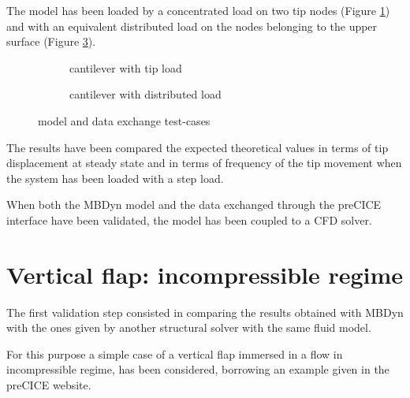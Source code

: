 The model has been loaded by a concentrated load on two tip nodes (Figure \ref{fig:cnt-tip}) and with an equivalent distributed load on the nodes belonging to the upper surface (Figure \ref{fig:cnt-distrib}).

\begin{figure}[htbp!]
	    \begin{subfigure}{.8\textwidth}
	    \centering
    	\caption{cantilever with tip load}
		\label{fig:cnt-tip}
	    \end{subfigure}
	    \par\bigskip
	    \begin{subfigure}{.8\textwidth}
		\centering
    	\caption{cantilever with distributed load}
		\label{fig:cnt-distrib}
	    \end{subfigure}
	\caption{model and data exchange test-cases}
\end{figure}

The results have been compared the expected theoretical values in terms of tip displacement at steady state and in terms of frequency of the tip movement when the system has been loaded with a step load.

When both the MBDyn model and the data exchanged through the preCICE interface have been validated, the model has been coupled to a CFD solver.





\section{Vertical flap: incompressible regime}
\label{sec:cx-mbd}

The first validation step consisted in comparing the results obtained with MBDyn with the ones given by another structural solver with the same fluid model. 

For this purpose a simple case of a vertical flap immersed in a flow in incompressible regime, has been considered, borrowing an example given in the preCICE website.

